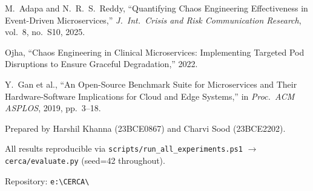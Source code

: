 \documentclass[11pt,a4paper]{article}
\begin{document}
\begin{enumerate}[leftmargin=2em,itemsep=2pt,label={[\arabic*]}]
  \item M.\ Adapa and N.\ R.\ S.\ Reddy, ``Quantifying Chaos Engineering
        Effectiveness in Event-Driven Microservices,'' \emph{J.\ Int.\ Crisis
        and Risk Communication Research}, vol.\ 8, no.\ S10, 2025.

  \item Ojha, ``Chaos Engineering in Clinical Microservices: Implementing
        Targeted Pod Disruptions to Ensure Graceful Degradation,'' 2022.

  \item Y.\ Gan et al., ``An Open-Source Benchmark Suite for Microservices and
        Their Hardware-Software Implications for Cloud and Edge Systems,'' in
        \emph{Proc.\ ACM ASPLOS}, 2019, pp.\ 3--18.

\end{enumerate}

\vfill
{\footnotesize\centering
  Prepared by Harshil Khanna (23BCE0867) and Charvi Sood (23BCE2202).\par
  All results reproducible via \texttt{scripts/run\_all\_experiments.ps1} $\to$ \texttt{cerca/evaluate.py} (seed=42 throughout).\par
  Repository: \texttt{e:\textbackslash CERCA\textbackslash}\par
}
\end{document}
